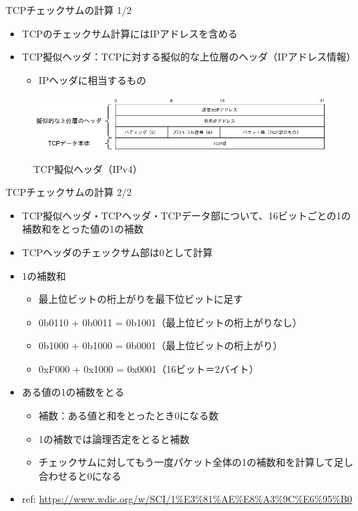 \documentclass[12pt,aspectratio=169]{beamer}
\begin{document}
\begin{frame}{TCPチェックサムの計算 1/2}

  \begin{itemize}
    \item TCPのチェックサム計算にはIPアドレスを含める
    \item TCP擬似ヘッダ：TCPに対する擬似的な上位層のヘッダ（IPアドレス情報）
      \begin{itemize}
        \item IPヘッダに相当するもの
      \end{itemize}
  \end{itemize}

  \centering
  \begin{figure}
    \centering
    \includegraphics[width=12cm,bb=0 0 791 141]{./figures/tcp_pseudo_header.png}
    \label{fig:tcp_pseudo_header}
    \caption{TCP擬似ヘッダ（IPv4）}
  \end{figure}

\end{frame}


\begin{frame}{TCPチェックサムの計算 2/2}

  \begin{itemize}
    \item TCP擬似ヘッダ・TCPヘッダ・TCPデータ部について、16ビットごとの1の補数和をとった値の1の補数
    \item TCPヘッダのチェックサム部は0として計算
    \item 1の補数和
      \begin{itemize}
        \item 最上位ビットの桁上がりを最下位ビットに足す
        \item 0b0110 + 0b0011 = 0b1001（最上位ビットの桁上がりなし）
        \item 0b1000 + 0b1000 = 0b0001（最上位ビットの桁上がり）
        \item 0xF000 + 0x1000 = 0x0001（16ビット＝2バイト）
      \end{itemize}
    \item ある値の1の補数をとる
    \begin{itemize}
      \item 補数：ある値と和をとったとき0になる数
      \item 1の補数では論理否定をとると補数
      \item チェックサムに対してもう一度パケット全体の1の補数和を計算して足し合わせると0になる
    \end{itemize}

    \item ref: \url {https://www.wdic.org/w/SCI/1\%E3\%81\%AE\%E8\%A3\%9C\%E6\%95\%B0}
  \end{itemize}

\end{frame}
\end{document}

